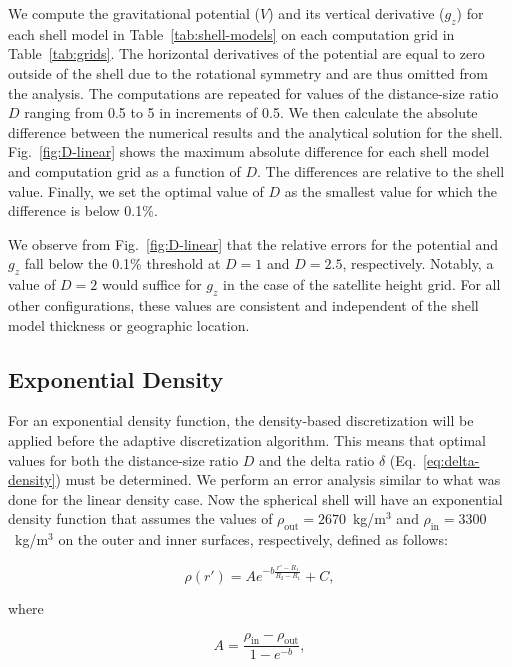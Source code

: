 \documentclass[extra, referee]{gji}
\begin{document}
We compute the gravitational potential ($V$) and its vertical derivative ($g_z$) for
each shell model in Table~\ref{tab:shell-models} on each computation grid in
Table~\ref{tab:grids}.
The horizontal derivatives of the potential are equal to zero outside of the shell due
to the rotational symmetry and are thus omitted from the analysis.
The computations are repeated for values of the distance-size ratio $D$ ranging from 0.5
to 5 in increments of 0.5.
We then calculate the absolute difference between the numerical results and the
analytical solution for the shell.
Fig.~\ref{fig:D-linear} shows the maximum absolute difference for each shell model and
computation grid as a function of $D$.
The differences are relative to the shell value.
Finally, we set the optimal value of $D$ as the smallest value for which the difference
is below 0.1\%.

We observe from Fig.~\ref{fig:D-linear} that the relative errors for the potential and
$g_z$ fall below the 0.1\% threshold at $D=1$ and $D=2.5$, respectively.
Notably, a value of $D=2$ would suffice for $g_z$ in the case of the satellite height
grid.
For all other configurations, these values are consistent and independent of the shell
model thickness or geographic location.


\subsection{Exponential Density}

For an exponential density function, the density-based discretization will be applied
before the adaptive discretization algorithm.
This means that optimal values for both the distance-size ratio $D$ and the delta ratio
$\delta$ (Eq.~\ref{eq:delta-density}) must be determined.
We perform an error analysis similar to what was done for the linear density case.
Now the spherical shell will have an exponential density function that assumes the
values of $\rho_\text{out} = 2670$~kg/m$^3$ and $\rho_\text{in} = 3300$~kg/m$^3$ on the
outer and inner surfaces, respectively, defined as follows:

\begin{equation}
    \rho(r') = A e^{- b \frac{r' - R_1}{R_2 - R_1}} + C,
    \label{eq:density-exp}
\end{equation}

\noindent where

\begin{equation}
    A = \frac{\rho_\text{in} - \rho_\text{out}}{1 - e^{-b}},
\end{equation}
\end{document}
